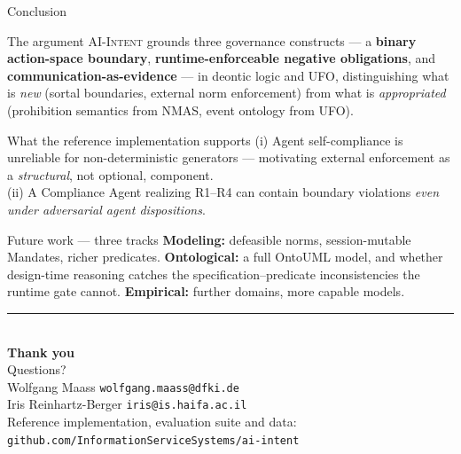 \documentclass[aspectratio=169,10pt]{beamer}
\newcommand{\ai}{\textsc{AI-Intent}}
\newcommand{\key}[1]{\textcolor{aiAccent}{\textbf{#1}}}
\begin{document}
\begin{frame}{Conclusion}
  \begin{block}{The argument}
    \small
    \ai{} grounds three governance constructs --- a \key{binary action-space
    boundary}, \key{runtime-enforceable negative obligations}, and
    \key{communication-as-evidence} --- in deontic logic and UFO, distinguishing
    what is \emph{new} (sortal boundaries, external norm enforcement) from what is
    \emph{appropriated} (prohibition semantics from NMAS, event ontology from UFO).
  \end{block}
  \begin{block}{What the reference implementation supports}
    \small
    (i) Agent self-compliance is unreliable for non-deterministic generators ---
    motivating external enforcement as a \emph{structural}, not optional, component.\\[0.3em]
    (ii) A Compliance Agent realizing R1--R4 can contain boundary violations
    \emph{even under adversarial agent dispositions}.
  \end{block}
  \begin{block}{Future work --- three tracks}
    \small
    \textbf{Modeling:} defeasible norms, session-mutable Mandates, richer predicates.
    \quad\textbf{Ontological:} a full OntoUML model, and whether design-time
    reasoning catches the specification--predicate inconsistencies the runtime gate
    cannot. \quad\textbf{Empirical:} further domains, more capable models.
  \end{block}
\end{frame}

\begin{frame}
  \vfill
  \begin{center}
    {\color{aiAccent}\rule{2.2em}{2.5pt}}\\[0.8em]
    {\LARGE\bfseries\color{aiPrimary}Thank you}\\[1.2em]
    {\large\color{aiPrimary}Questions?}\\[1.6em]
    {\footnotesize\color{aiGray}
      Wolfgang Maass \quad\texttt{wolfgang.maass@dfki.de}\\
      Iris Reinhartz-Berger \quad\texttt{iris@is.haifa.ac.il}\\[0.8em]
      Reference implementation, evaluation suite and data:\\
      \texttt{github.com/InformationServiceSystems/ai-intent}}
  \end{center}
  \vfill
\end{frame}
\end{document}

